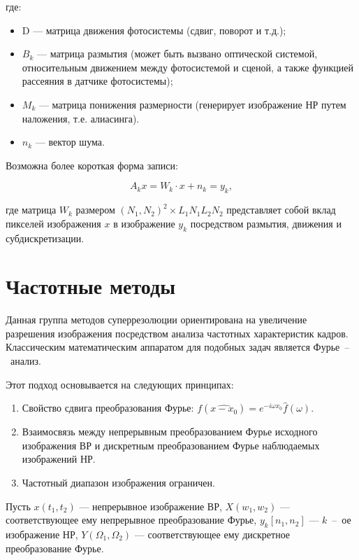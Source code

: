 где:

\begin{itemize}
    \item D --- матрица движения фотосистемы (сдвиг, поворот и т.д.);
    \item $B_k$ --- матрица размытия (может быть вызвано оптической системой, относительным движением между фотосистемой и сценой, а также функцией рассеяния в датчике фотосистемы);
    \item $M_k$ --- матрица понижения размерности (генерирует изображение НР путем наложения, т.е. алиасинга). %
    \item $n_k$ --- вектор шума.
\end{itemize}

Возможна более короткая форма записи:

\begin{equation}
    A_kx = W_k\cdot x + n_k = y_k,
\end{equation}

где матрица $W_k$ размером $(N_1, N_2)^2 \times L_1 N_1 L_2 N_2$ представляет собой вклад пикселей изображения $x$ в изображение $y_k$ посредством размытия, движения и субдискретизации.

\clearpage

\section{Частотные методы}

Данная группа методов суперрезолюции ориентирована на увеличение разрешения изображения посредством анализа частотных характеристик кадров. Классическим математическим аппаратом для подобных задач является Фурье~--~анализ.

Этот подход основывается на следующих принципах:

\begin{enumerate}
    \item Свойство сдвига преобразования Фурье: $f(\widehat{x - x_0}) = e^{-i\omega x_0}\hat{f}(\omega)$.
    \item Взаимосвязь между непрерывным преобразованием Фурье исходного изображения ВР и дискретным преобразованием Фурье наблюдаемых изображений НР.
    \item Частотный диапазон изображения ограничен.
\end{enumerate}

Пусть $x(t_1, t_2)$ --- непрерывное изображение ВР, $X(w_1, w_2)$ --- соответствующее ему непрерывное преобразование Фурье, $y_k[n_1, n_2]$ --- $k$~--~ое изображение НР, $Y(\Omega_1, \Omega_2)$ --- соответствующее ему дискретное преобразование Фурье.

